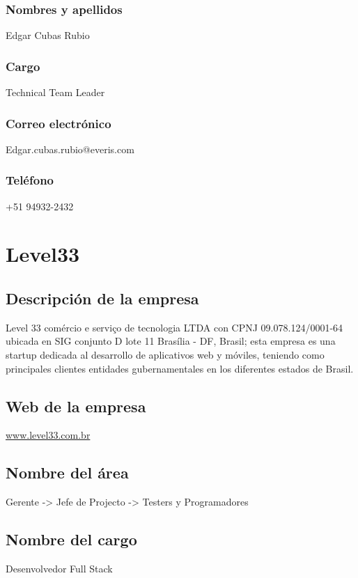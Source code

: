 \subsubsection{Nombres y apellidos} 
Edgar Cubas Rubio 

\subsubsection{Cargo}
Technical Team Leader

\subsubsection{Correo electrónico} 
Edgar.cubas.rubio@everis.com

\subsubsection{Teléfono} 
+51 94932-2432



\section{Level33}

\subsection{Descripción de la empresa}
Level 33 comércio e serviço de tecnologia LTDA con CPNJ 09.078.124/0001-64 ubicada en SIG conjunto D lote 11 Brasília - DF, Brasil; esta empresa es una startup dedicada al desarrollo de aplicativos web y móviles, teniendo como principales clientes entidades gubernamentales en los diferentes estados de Brasil. 

\subsection{Web de la empresa}
\url{www.level33.com.br}

\subsection{Nombre del área}
Gerente -> Jefe de Projecto -> Testers y Programadores


\subsection{Nombre del cargo}
Desenvolvedor Full Stack

